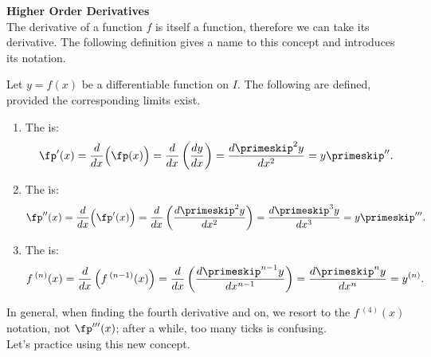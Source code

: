 \noindent\textbf{\large Higher Order Derivatives}\\

The derivative of a function $f$ is itself a function, therefore we can take its derivative. The following definition gives a name to this concept and introduces its notation.
\enlargethispage{2\baselineskip}
{}
{Let $y=f(x)$ be a differentiable function on $I$. The following are defined, provided the corresponding limits exist. 
		\begin{enumerate}
		\item		The  is: 
\[
 \fp'(x) = \frac{d}{dx}\Big(\fp(x)\Big) = \frac{d}{dx}\left(\frac{dy}{dx}\right) = \frac{d\primeskip^2y}{dx^2}=y\primeskip''.
\]
				\item		The  is: 
\[
\fp''(x) = \frac{d}{dx}\Big(\fp'(x)\Big) = \frac{d}{dx}\left(\frac{d\primeskip^2y}{dx^2}\right) = \frac{d\primeskip^3y}{dx^3}=y\primeskip'''.
\]
				\item		The  is:
\[
 f\,^{(n)}(x) = \frac{d}{dx}\left(f\,^{(n-1)}(x)\right) = \frac{d}{dx}\left(\frac{d\primeskip^{n-1}y}{dx^{n-1}}\right) = \frac{d\primeskip^ny}{dx^n}=y^{(n)}.
\]
		\end{enumerate}
}
\normalsize

In general, when finding the fourth derivative and on, we resort to the $f\,^{(4)}(x)$ notation, not $\fp'''(x)$; after a while, too many ticks is  confusing.\\

Let's practice using this new concept.\\

